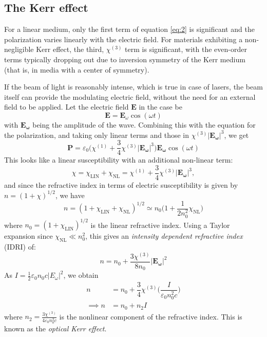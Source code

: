 \documentclass[%
 reprint,
 amsmath,amssymb,
 aps,
]{revtex4-2}
\begin{document}
	\subsection{The Kerr effect}
		For a linear medium, only the first term of equation \eqref{eq:2} is significant and the polarization varies linearly with the electric field. For materials exhibiting a non-negligible Kerr effect, the third, $ \chi^{(3)} $ term is significant, with the even-order terms typically dropping out due to inversion symmetry of the Kerr medium (that is, in media with a center of symmetry).
		\par 
		If the beam of light is reasonably intense, which is true in case of lasers, the beam itself can provide the modulating electric field, without the need for an external field to be applied. Let the electric field $ \mathbf{E} $ in the case be
		\begin{equation}\label{key}
			\mathbf{E} = \mathbf{E}_{\omega} \cos (\omega t)
		\end{equation}
		with $ \mathbf{E_{\omega}} $ being the amplitude of the wave. Combining this with the equation for the polarization, and taking only linear terms and those in $ \chi^{(3)} |\mathbf{E_{\omega}}|^3$, we get
		\begin{equation}\label{key}
			\mathbf{P} = \varepsilon_0 \Big( \chi^{(1)} + \dfrac{3}{4}\chi^{(3)} |\mathbf{E_{\omega}}|^3 \Big) \mathbf{E_{\omega}} \cos (\omega t)
		\end{equation}
		This looks like a linear susceptibility with an additional non-linear term:
		\begin{equation}\label{key}
			\chi = \chi_{\mathrm{LIN}} + \chi_{\mathrm{NL}} = \chi^{(1)} + \dfrac{3}{4}\chi^{(3)} |\mathbf{E_{\omega}}|^3,
		\end{equation}
		and since the refractive index in terms of electric susceptibility is given by $ n = (1 + \chi)^{1/2}$, we have
		\begin{equation}\label{key}
			n = (1 + \chi_{\mathrm{LIN}} + \chi_{\mathrm{NL}})^{1/2} \simeq n_0 \Big( 1 + \dfrac{1}{2n_0^2} \chi_{\mathrm{NL}} \Big)
		\end{equation}
		where $ n_0 = (1 + \chi_{\mathrm{LIN}})^{1/2} $ is the linear refractive index. Using a Taylor expansion since $ \chi_{\mathrm{NL}} \ll n_0^2 $, this gives an \textit{intensity dependent refractive index} (IDRI) of:
		\begin{equation}\label{eq:7}
				n = n_0 + \dfrac{3 \chi^{(3)}}{8 n_0} |\mathbf{E_{\omega}}|^2
		\end{equation}
		As $ I = \frac{1}{2} \varepsilon_0 n_0 c |E_{\omega}|^2$, we obtain
		\begin{equation}\label{eq:8}
			\begin{split}
				n &= n_0 + \dfrac{3}{4} \chi^{(3)} \Big( \dfrac{I}{\varepsilon_0 n_0^2 c} \Big) \\
				\implies n &= n_0 + n_2 I
			\end{split}
		\end{equation}
		where $ n_2  = \frac{3 \chi^{(3)}}{4 \varepsilon_0 n_0^2 c}$  is the nonlinear component of the refractive index. This is known as the \textit{optical Kerr effect}.
\end{document}
